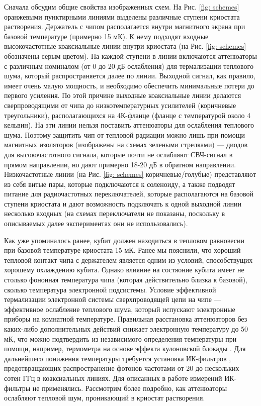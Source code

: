 Сначала обсудим общие свойства изображенных схем. На Рис. \ref{fig: schemes} оранжевыми пунктирными линиями выделены различные ступени криостата растворения. Держатель с чипом располагается внутри магнитного экрана при базовой температуре (примерно 15 мК). К нему подходят входные высокочастотные коаксиальные линии внутри криостата (на Рис. \ref{fig: schemes} обозначены серым цветом). На каждой ступени в линии включаются аттенюаторы с различным номиналом (от 0 до 20 дБ ослабления) для термализации теплового шума, который распространяется далее по линии. Выходной сигнал, как правило, имеет очень малую мощность, и необходимо обеспечить минимальные потери до первого усиления. По этой причине выходные коаксиальные линии  делаются сверпроводящими от чипа до низкотемпературных усилителей (коричневые треугольники), располагающихся на 4К-фланце (фланце с температурой около 4 кельвин). На эти линии нельзя поставить аттенюаторы для ослабления теплового шума. Поэтому защитить чип от тепловой радиации можно лишь при помощи магнитных изоляторов (изображены на схемах зелеными стрелками) --- диодов для высокочастотного сигнала, которые почти не ослабляют СВЧ-сигнал в прямом направлении, но дают примерно 18-20 дБ в обратном направлении.  Низкочастотные линии (на Рис. \ref{fig: schemes} коричневые/голубые) представляют из себя витые пары, которые подключаются к соленоиду, а также подводят питание для радиочастотных переключателей, которые располагаются на базовой ступени криостата и дают возможность подключать к одной выходной линии несколько входных (на схемах переключатели не показаны, поскольку в описываемых далее экспериментах они не использовались).

Как уже упоминалось ранее, кубит должен находиться в тепловом равновесии при базовой температуре криостата 15 мК. Ранее мы пояснили, что хороший тепловой контакт чипа с держателем является одним из условий, способствущих хорошему охлаждению кубита. Однако влияние на состяоние кубита имеет не столько фононная температура чипа (которая действительно близка к базовой), сколько температура электронной подсистемы. Условие эффективной термализации электронной системы сверхпроводящей цепи на чипе --- эффективное ослабление теплового шума, который испускают электронные приборы на комнатной температуре. Правильная расстановка аттенюаторов без каких-либо дополнительных действий снижает электронную температуру до 50 мК, что можно подтвердить из независимого определения температуры при помощи, например, термометра на основе эффекта кулоновской блокады \cite{Meschke2004}. Для дальнейшего понижения температуры требуется установка ИК-фильтров \cite{Longobardi2013}, предотвращающих распространение фотонов частотами от 20 до нескольких сотен ГГц в коаксиальных линиях. Для описанных в работе измерений ИК-фильтры не применялись. Рассмотрим более подробно, как аттенюаторы ослабляют тепловой шум, проникающий в криостат растворения.

